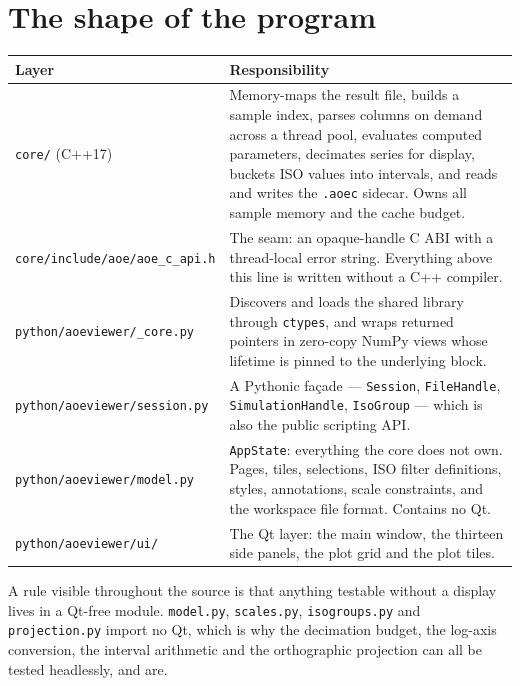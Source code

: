 \documentclass[11pt,a4paper,oneside]{report}
\newcommand{\code}[1]{\texttt{#1}}
\begin{document}
\section{The shape of the program}

\begin{center}
\small
\begin{tabular}{@{}p{}p{}@{}}
\toprule
\textbf{Layer} & \textbf{Responsibility} \\
\midrule
\code{core/} (C++17) &
  Memory-maps the result file, builds a sample index, parses columns on demand
  across a thread pool, evaluates computed parameters, decimates series for
  display, buckets ISO values into intervals, and reads and writes the
  \code{.aoec} sidecar. Owns all sample memory and the cache budget. \\
\addlinespace
\code{core/include/aoe/aoe\_c\_api.h} &
  The seam: an opaque-handle C ABI with a thread-local error string. Everything
  above this line is written without a C++ compiler. \\
\addlinespace
\code{python/aoeviewer/\_core.py} &
  Discovers and loads the shared library through \code{ctypes}, and wraps
  returned pointers in zero-copy NumPy views whose lifetime is pinned to the
  underlying block. \\
\addlinespace
\code{python/aoeviewer/session.py} &
  A Pythonic fa\c{c}ade --- \code{Session}, \code{FileHandle},
  \code{SimulationHandle}, \code{IsoGroup} --- which is also the public
  scripting API. \\
\addlinespace
\code{python/aoeviewer/model.py} &
  \code{AppState}: everything the core does not own. Pages, tiles, selections,
  ISO filter definitions, styles, annotations, scale constraints, and the
  workspace file format. Contains no Qt. \\
\addlinespace
\code{python/aoeviewer/ui/} &
  The Qt layer: the main window, the thirteen side panels, the plot grid and the
  plot tiles. \\
\bottomrule
\end{tabular}
\end{center}

A rule visible throughout the source is that anything testable without a
display lives in a Qt-free module. \code{model.py}, \code{scales.py},
\code{isogroups.py} and \code{projection.py} import no Qt, which is why the
decimation budget, the log-axis conversion, the interval arithmetic and the
orthographic projection can all be tested headlessly, and are.
\end{document}
